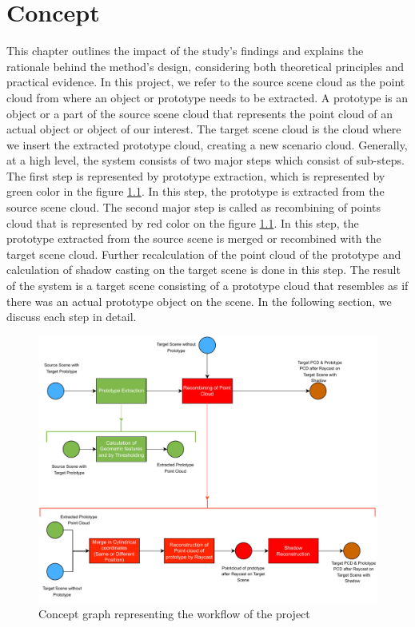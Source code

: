 \chapter{Concept}

This chapter outlines the impact of the study's findings and explains the rationale behind the method's design, considering both theoretical principles and practical evidence.
In this project, we refer to the source scene cloud as the point cloud from where an object or prototype needs to be extracted. A prototype is an object or a part of the source scene cloud that represents the point cloud of an actual object or object of our interest. The target scene cloud is the cloud where we insert the extracted prototype cloud, creating a new scenario cloud.
Generally, at a high level, the system consists of two major steps which consist of sub-steps. The first step is represented by prototype extraction, which is represented by green color in the figure \ref{fig:concept-graph}. In this step, the prototype is extracted from the source scene cloud. The second major step is called as recombining of points cloud that is represented by red color on the figure \ref{fig:concept-graph}. In this step, the prototype extracted from the source scene is merged or recombined with the target scene cloud. Further recalculation of the point cloud of the prototype and calculation of shadow casting on the target scene is done in this step. The result of the system is a target scene consisting of a prototype cloud that resembles as if there was an actual prototype object on the scene. In the following section, we discuss each step in detail.

\begin{figure}[htbp]
    \centering
    \includegraphics[width=1\linewidth]{97_graphics/concepts/graph_main.pdf}
    \caption{Concept graph representing the workflow of the project}
    \label{fig:concept-graph}
\end{figure}



